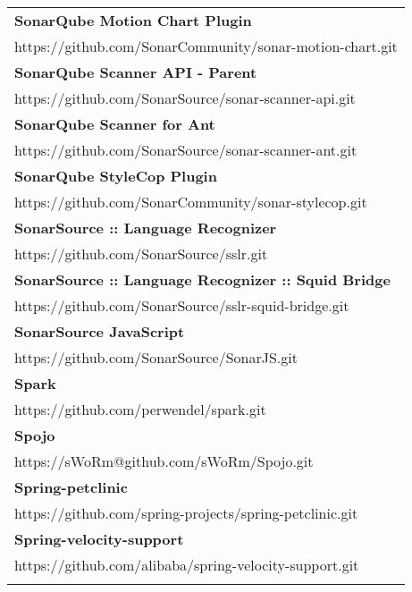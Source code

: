 \begin{table}[]
\small
\begin{tabular}{|p{130mm}|}
\hline 
\bf  SonarQube Motion Chart Plugin                      \\ https://github.com/SonarCommunity/sonar-motion-chart.git                     \\ \hline \bf
SonarQube Scanner API - Parent                     \\ https://github.com/SonarSource/sonar-scanner-api.git                         \\ \hline \bf
SonarQube Scanner for Ant                          \\ https://github.com/SonarSource/sonar-scanner-ant.git                         \\ \hline \bf
SonarQube StyleCop Plugin                          \\ https://github.com/SonarCommunity/sonar-stylecop.git                         \\ \hline \bf
SonarSource :: Language Recognizer                 \\ https://github.com/SonarSource/sslr.git                                      \\ \hline \bf 
SonarSource :: Language Recognizer :: Squid Bridge \\ https://github.com/SonarSource/sslr-squid-bridge.git                         \\ \hline \bf
SonarSource JavaScript                             \\ https://github.com/SonarSource/SonarJS.git                                   \\ \hline \bf
Spark                                              \\ https://github.com/perwendel/spark.git                                       \\ \hline \bf
Spojo                                              \\ https://sWoRm@github.com/sWoRm/Spojo.git                                     \\ \hline \bf
Spring-petclinic                                   \\ https://github.com/spring-projects/spring-petclinic.git                      \\ \hline \bf
Spring-velocity-support                            \\ https://github.com/alibaba/spring-velocity-support.git                       \\ \hline \bf

\end{tabular}
\end{table}
